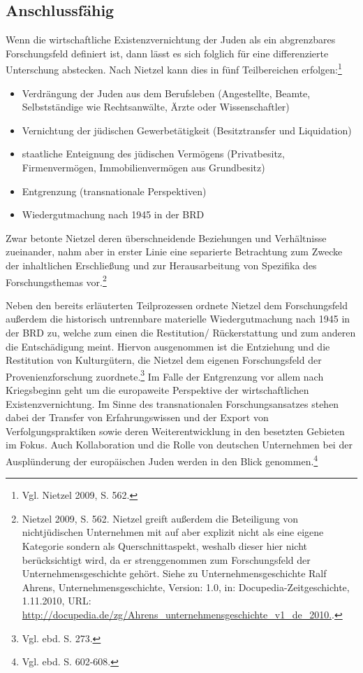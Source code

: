 \subsection{Anschlussfähig}

Wenn die wirtschaftliche Existenzvernichtung der Juden als ein abgrenzbares Forschungsfeld definiert ist, dann lässt es sich folglich für eine differenzierte Unterschung abstecken. Nach Nietzel kann dies in fünf Teilbereichen erfolgen:\footnote{Vgl. Nietzel 2009, S. 562.}
\begin{itemize}
\item Verdrängung der Juden aus dem Berufsleben (Angestellte, Beamte, Selbstständige wie Rechtsanwälte, Ärzte oder Wissenschaftler)
\item Vernichtung der jüdischen Gewerbetätigkeit (Besitztransfer und Liquidation)
\item staatliche Enteignung des jüdischen Vermögens (Privatbesitz, Firmenvermögen, Immobilienvermögen aus Grundbesitz) 
\item Entgrenzung (transnationale Perspektiven)
\item Wiedergutmachung nach 1945 in der BRD
\end{itemize}

Zwar betonte Nietzel deren überschneidende Beziehungen und Verhältnisse zueinander, nahm aber in erster Linie eine separierte Betrachtung zum Zwecke der inhaltlichen Erschließung und zur Herausarbeitung von Spezifika des Forschungsthemas vor.\footnote{Nietzel 2009, S. 562. Nietzel greift außerdem die Beteiligung von nichtjüdischen Unternehmen mit auf aber explizit nicht als eine eigene Kategorie sondern als Querschnittaspekt, weshalb dieser hier nicht berücksichtigt wird, da er strenggenommen zum Forschungsfeld der Unternehmensgeschichte gehört. Siehe zu Unternehmensgeschichte Ralf Ahrens, Unternehmensgeschichte, Version: 1.0, in: Docupedia-Zeitgeschichte, 1.11.2010, URL: \url{http://docupedia.de/zg/Ahrens_unternehmensgeschichte_v1_de_2010.}.} 

Neben den bereits erläuterten Teilprozessen ordnete Nietzel dem Forschungsfeld außerdem die historisch untrennbare materielle Wiedergutmachung nach 1945 in der BRD zu, welche zum einen die Restitution/ Rückerstattung und zum anderen die Entschädigung meint. Hiervon ausgenommen ist die Entziehung und die Restitution von Kulturgütern, die Nietzel dem eigenen Forschungsfeld der Provenienzforschung zuordnete.\footnote{Vgl. ebd. S. 273.} Im Falle der Entgrenzung vor allem nach Kriegsbeginn geht um die europaweite Perspektive der wirtschaftlichen Existenzvernichtung. Im Sinne des transnationalen Forschungsansatzes stehen dabei der Transfer von Erfahrungswissen und der Export von Verfolgungspraktiken sowie deren Weiterentwicklung in den besetzten Gebieten im Fokus. Auch Kollaboration und die Rolle von deutschen Unternehmen bei der Ausplünderung der europäischen Juden werden in den Blick genommen.\footnote{Vgl. ebd. S. 602-608.}

